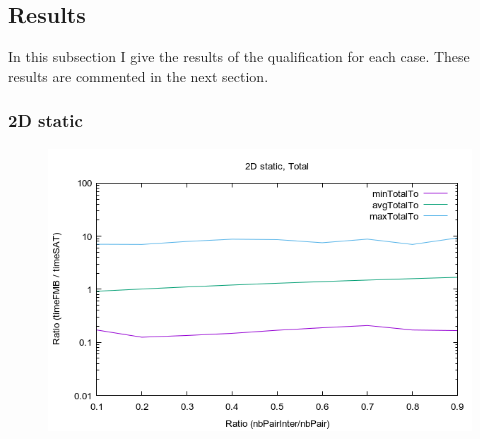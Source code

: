 \documentclass[12pt, a4paper]{article}
\begin{document}
\subsection{Results}

In this subsection I give the results of the qualification for each case. These results are commented in the next section.\\

\subsubsection{2D static}


\begin{center}
\begin{figure}[H]
\centering\includegraphics[width=12cm]{../Results/qualification2D.png}\\
\end{figure}
\end{center}
\end{document}
